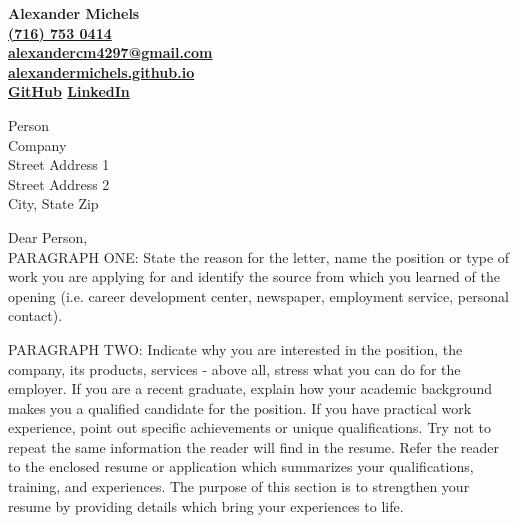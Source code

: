 \documentclass[12pt,fleqn,notitlepage,minimal]{article} %
\begin{document}
		
		\begin{center}
			\bf Alexander Michels \\ %
			\href{tel:+17167530414}{(716) 753 0414} \\
			\href{mailto:alexandercm4297@gmail.com}{\textbf{alexandercm4297@gmail.com}} \\ \href{http://alexandermichels.github.io}{\textbf{alexandermichels.github.io}} \\ \href{http://github.com/alexandermichels}{\textbf{GitHub}}  \hspace{.5cm}   \href{https://www.linkedin.com/in/alexmichels/}{\textbf{LinkedIn}}
		\end{center} 

\begin{flushleft}
	Person \\
	Company \\
	Street Address 1 \\
	Street Address 2 \\
	City, State Zip
\end{flushleft}

\vspace{.5cm}

\noindent Dear Person, \\

PARAGRAPH ONE: State the reason for the letter, name the position or type of work you are applying for and identify the source from which you learned of the opening (i.e. career development center, newspaper, employment service, personal contact).

PARAGRAPH TWO: Indicate why you are interested in the position, the company, its products, services - above all, stress what you can do for the employer. If you are a recent graduate, explain how your academic background makes you a qualified candidate for the position. If you have practical work experience, point out specific achievements or unique qualifications. Try not to repeat the same information the reader will find in the resume. Refer the reader to the enclosed resume or application which summarizes your qualifications, training, and experiences. The purpose of this section is to strengthen your resume by providing details which bring your experiences to life. 
 
\end{document}
